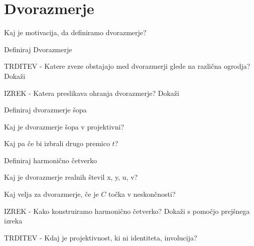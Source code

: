 \documentclass{article}
\begin{document}
    \section{Dvorazmerje}
    \begin{enumerate}
        \item Kaj je motivacija, da definiramo dvorazmerje?
        \item Definiraj Dvorazmerje
        {\color{red}\item TRDITEV - Katere zveze obstajajo med dvorazmerji glede na različna ogrodja? Dokaži}
        \item IZREK - Katera preslikava ohranja dvorazmerje? Dokaži
        \item Definiraj dvorazmerje šopa
        \item Kaj je dvorazmerje šopa v projektivni?
        \item Kaj pa če bi izbrali drugo premico $t$?
        \item Definiraj harmonično četverko
        \item Kaj je dvorazmerje realnih števil x, y, u, v?
        {\color{red}\item Kaj velja za dvorazmerje, če je $C$ točka v neskončnosti?}
        {\color{red}\item IZREK - Kako konstruiramo harmonično četverko? Dokaži s pomočjo prejšnega izreka}
        {\color{red}\item TRDITEV - Kdaj je projektivnost, ki ni identiteta, involucija?}
    \end{enumerate}
\end{document}
